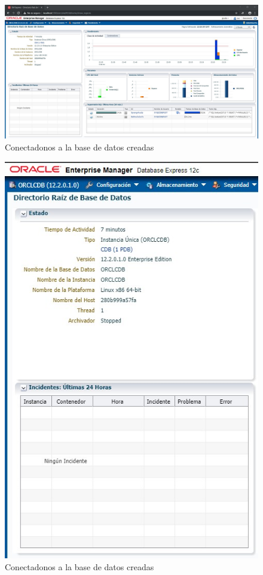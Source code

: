 \documentclass[preprint,12pt]{elsarticle}
\begin{document}
\begin{figure}[H]
	\begin{center}
		\includegraphics[width=12cm]{./IMAGENES/foto15} 
		\caption{Conectadonos a la base de datos creadas}
	\end{center}
\end{figure}

\begin{figure}[H]
	\begin{center}
		\includegraphics[width=12cm]{./IMAGENES/foto16} 
		\caption{Conectadonos a la base de datos creadas}
	\end{center}
\end{figure}
\end{document}
